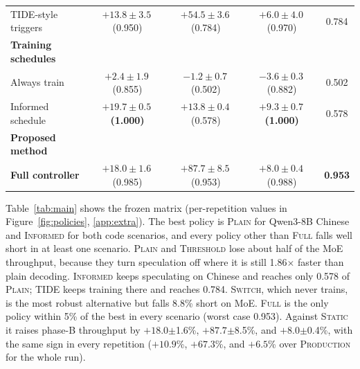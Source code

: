 \documentclass{article}
\newcommand{\pol}[1]{\textsc{#1}}
\begin{document}
\begin{table}[t]
\begin{tabular}{@{}lcccc@{}}
TIDE-style triggers
& $+13.8\pm3.5$\,{\scriptsize(0.950)}
& $+54.5\pm3.6$\,{\scriptsize(0.784)}
& $+6.0\pm4.0$\,{\scriptsize(0.970)}
& 0.784 \\

\addlinespace[3pt]

\rowcolor{tabGroup}
\textbf{\footnotesize Training schedules}
& & & & \\

Always train
& $+2.4\pm1.9$\,{\scriptsize(0.855)}
& $-1.2\pm0.7$\,{\scriptsize(0.502)}
& $-3.6\pm0.3$\,{\scriptsize(0.882)}
& 0.502 \\

\cellcolor{tabOracle}Informed schedule
& \cellcolor{tabBest}
  $\boldsymbol{+19.7\pm0.5}$\,{\scriptsize\bfseries(1.000)}
& $+13.8\pm0.4$\,{\scriptsize(0.578)}
& \cellcolor{tabBest}
  $\boldsymbol{+9.3\pm0.7}$\,{\scriptsize\bfseries(1.000)}
& 0.578 \\

\addlinespace[3pt]

\rowcolor{tabGroup}
\textbf{\footnotesize Proposed method}
& & & & \\

\rowcolor{tabFull}
\textbf{Full controller}
& $+18.0\pm1.6$\,{\scriptsize(0.985)}
& $+87.7\pm8.5$\,{\scriptsize(0.953)}
& $+8.0\pm0.4$\,{\scriptsize(0.988)}
& \cellcolor{tabBest}\textbf{0.953} \\

\bottomrule
\end{tabular}

\end{table}

Table~\ref{tab:main} shows the frozen matrix (per-repetition values in Figure~\ref{fig:policies}, \cref{app:extra}). The best policy is \pol{Plain} for Qwen3-8B Chinese and \pol{Informed} for both code scenarios, and every policy other than \pol{Full} falls well short in at least one scenario. \pol{Plain} and \pol{Threshold} lose about half of the MoE throughput, because they turn speculation off where it is still 1.86$\times$ faster than plain decoding. \pol{Informed} keeps speculating on Chinese and reaches only 0.578 of \pol{Plain}; \pol{TIDE} keeps training there and reaches 0.784. \pol{Switch}, which never trains, is the most robust alternative but falls 8.8\% short on MoE. \pol{Full} is the only policy within 5\% of the best in every scenario (worst case 0.953). Against \pol{Static} it raises phase-B throughput by $+18.0$$\pm$1.6\%, $+87.7$$\pm$8.5\%, and $+8.0$$\pm$0.4\%, with the same sign in every repetition ($+10.9$\%, $+67.3$\%, and $+6.5$\% over \pol{Production} for the whole run).
\end{document}
